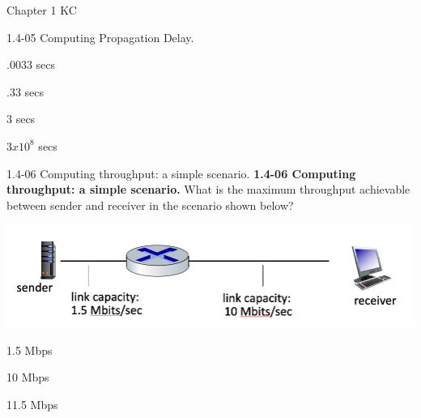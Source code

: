 \documentclass[a4paper]{article}
\begin{document}
\begin{quiz}{Chapter 1 KC}
\begin{multi}[points=1]{1.4-05 Computing Propagation Delay.}
\item* .0033 secs
\item .33 secs
\item 3 secs
\item $3 x 10^8$ secs
\end{multi}

\begin{multi}[points=1]{1.4-06 Computing throughput: a simple scenario.}
\textbf{1.4-06 Computing throughput: a simple scenario.} 
What is the maximum throughput achievable between sender and receiver in the scenario shown below? 
\begin{center}
\includegraphics[width=\linewidth]{figs/1.4.6.jpg}
\end{center}
%  
\item* 1.5 Mbps
\item 10 Mbps
\item 11.5 Mbps
\end{multi}


\end{quiz}
\end{document}
